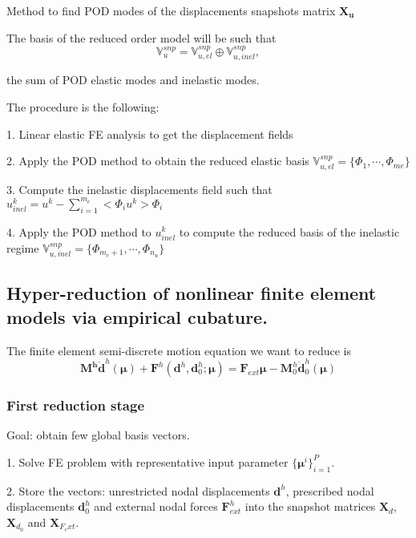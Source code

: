 \documentclass{article}
\begin{document}
Method to find POD modes of the displacements snapshots matrix $\bm{X_u}$ \newline

The basis of the reduced order model will be such that
\begin{equation}
  \mathbb{V}_{u}^{snp} = \mathbb{V}_{u,el}^{snp} \oplus \mathbb{V}_{u,inel}^{snp},
\end{equation}

the sum of POD elastic modes and inelastic modes.\newline

The procedure is the following:

1. Linear elastic FE analysis to get the displacement fields

2. Apply the POD method to obtain the reduced elastic basis $\mathbb{V}_{u,el}^{snp} = \{ \Phi_1, \cdots, \Phi_{me} \}$

3. Compute the inelastic displacements field such that $u_{inel}^k = u^k - \sum_{i=1}^{m_e} <\Phi_i u^k> \Phi_i$

4. Apply the POD method to $u_{inel}^k$ to compute the reduced basis of the inelastic regime $\mathbb{V}_{u,inel}^{snp} = \{ \Phi_{m_e+1}, \cdots, \Phi_{n_u} \}$

\subsection{Hyper-reduction of nonlinear finite element models via empirical cubature. \cite{hernandez17}}

The finite element semi-discrete motion equation we want to reduce is
\begin{equation}
  \bm{M^h} \bm{\ddot{d}}^h(\bm{\mu}) + \bm{F}^h(\bm{d}^h, \bm{d}_0^h; \bm{\mu}) = \bm{F}_{ext} \bm{\mu} - \bm{M}_0^h \bm{\ddot{d}}_0^h(\bm{\mu})
\end{equation}

\subsubsection{First reduction stage}
Goal: obtain few global basis vectors.

1. Solve FE problem with representative input parameter $\{\bm{\mu}^i\}_{i=1}^P$.

2. Store the vectors: unrestricted nodal displacements $\bm{d}^h$, prescribed nodal displacements $\bm{d}_0^h$ and external nodal forces $\bm{F}^h_{ext}$ into the snapshot matrices $\bm{X}_d$, $\bm{X}_{d_0}$ and $\bm{X}_{F_ext}$.
\end{document}
